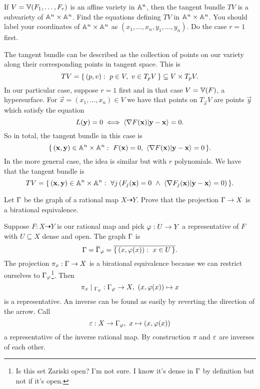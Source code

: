 \documentclass[12pt]{memoir}
\begin{document}
\begin{Ej}
    If $V = \mathbb{V}(F_1,\dots, F_r)$ is an affine variety in $\mathbb{A}^n$, then the
    tangent bundle $TV$ is a subvariety of $\mathbb{A}^n\times\mathbb{A}^n$. Find the equations defining $TV$ in
    $\mathbb{A}^n\times\mathbb{A}^n$. You should label your coordinates of $\mathbb{A}^n\times\mathbb{A}^n$ as $(x_1,\dots,x_n,y_1,\dots,y_n)$. Do the case $r = 1$ first.
\end{Ej}

\begin{ptcbr}
    The tangent bundle can be described as the collection of points on our variety along their corresponding points in tangent space. This is
    $$TV=\{\,(p,v):\ p\in V,\ v\in T_pV\,\}\subseteq V\times T_pV.$$
    In our particular case, suppose $r=1$ first and in that case $V=\mathbb{V}(F)$, a hypersurface. For $\vec{x}=(x_1,\dots,x_n)\in V$ we have that points on $T_{\vec{x}}V$ are points $\vec{y}$ which satisfy the equation 
    $$L(\mathbf{y})=0\iff \braket{\nabla F(\mathbf{x})}{\mathbf{y}-\mathbf{x}}=0.$$
    So in total, the tangent bundle in this case is 
    $$\set{(\vec{x},\vec{y})\in\bA^n\x\bA^n:\ F(\vec{x})=0,\ \braket{\nb F(\vec{x})}{\vec{y}-\vec{x}}=0}.$$
    In the more general case, the idea is similar but with $r$ polynomials. We have that the tangent bundle is
    $$TV=\set{(\vec{x},\vec{y})\in\bA^n\x\bA^n:\ \forall j\left(F_j(\vec{x})=0\ \land\  \braket{\nb F_j(\vec{x})}{\vec{y}-\vec{x}}=0\right)}.$$
\end{ptcbr}

\begin{Ej}
    Let $\Gamma$ be the graph of a rational map $X\dashrightarrow Y$. Prove that the projection $\Gamma\to X$ is a birational equivalence.
\end{Ej}

\begin{ptcbr}
    Suppose $F:X\dashrightarrow Y$ is our rational map and pick $\varphi:U\to Y$ a representative of $F$ with $U\subseteq X$ dense and open. The graph $\Gamma$ is 
    $$\Gamma=\overline{\Gamma}_\varphi=\overline{\{\,(x,\varphi(x)):\ x\in U\,\}}.$$
    The projection $\pi_x:\Gamma\to X$ is a birational equivalence because we can restrict ourselves to $\Gamma_\varphi$\footnote{Is this set Zariski open? I'm not sure. I know it's dense in $\Gamma$ by definition but not if it's open.}. Then 
    $$\pi_x\mid_{\Ga_\vf}:\Ga_\vf\to X,\ (x,\vf(x))\mapsto x$$
    is a representative. An inverse can be found as easily by reverting the direction of the arrow. Call
    $$\varepsilon:X\to\Gamma_\varphi,\ x\mapsto(x,\varphi(x))$$
    a representative of the inverse rational map. By construction $\pi$ and $\varepsilon$ are inverses of each other.
\end{ptcbr}
\end{document}
